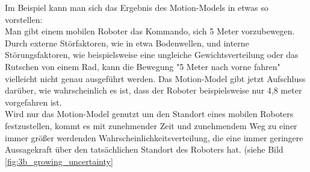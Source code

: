 Im Beispiel kann man sich das Ergebnis des Motion-Models in etwas so vorstellen:\\
Man gibt einem mobilen Roboter das Kommando, sich 5 Meter vorzubewegen. Durch externe Störfaktoren, wie in etwa Bodenwellen, und interne Störungsfaktoren, wie beispielsweise eine ungleiche Gewichtsverteilung oder das Rutschen von einem Rad, kann die Bewegung "5 Meter nach vorne fahren" vielleicht nicht genau ausgeführt werden. Das Motion-Model gibt jetzt Aufschluss darüber, wie wahrscheinlich es ist, dass der Roboter beispielsweise nur 4,8 meter vorgefahren ist.\\
Wird nur das Motion-Model genutzt um den Standort eines mobilen Roboters festzustellen, kommt es mit zunehmender Zeit und zunehmendem Weg zu einer immer größer werdenden Wahrscheinlichkeitsverteilung, die eine immer geringere Aussagekraft über den tatsächlichen Standort des Roboters hat. (siehe Bild \ref{fig:3b_growing_uncertainty}



